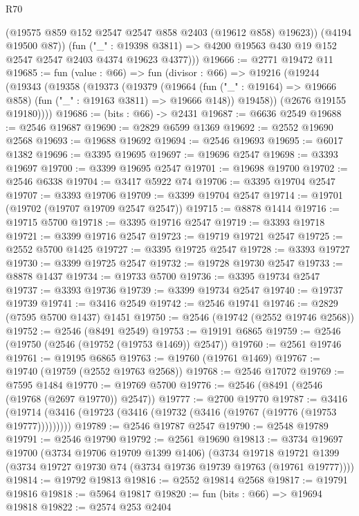 \begin{lexlean}{R70}
\begin{coremodule}
            (@19575 @859 @152 @2547 @2547 @858 @2403 (@19612 @858) @19623))
          (@4194 @19500 @87))
        (fun ("_" : @19398 @3811) =>
        @4200 @19563 @430 @19 @152 @2547 @2547 @2403 @4374 @19623 @4377)))
@19666 := @2771 @19472 @11
@19685 := fun (value : @66) =>
  fun (divisor : @66) =>
  @19216
    (@19244
      (@19343
        (@19358
          (@19373
            (@19379
              (@19664 (fun ("_" : @19164) => @19666 @858) (fun ("_" : @19163 @3811) => @19666 @148))
              @19458))
          (@2676 @19155 @19180))))
@19686 := (bits : @66) -> @2431
@19687 := @6636 @2549
@19688 := @2546 @19687
@19690 := @2829 @6599 @1369
@19692 := @2552 @19690 @2568
@19693 := @19688 @19692
@19694 := @2546 @19693
@19695 := @6017 @1382
@19696 := @3395 @19695
@19697 := @19696 @2547
@19698 := @3393 @19697
@19700 := @3399 @19695 @2547
@19701 := @19698 @19700
@19702 := @2546 @6338
@19704 := @3417 @5922 @74
@19706 := @3395 @19704 @2547
@19707 := @3393 @19706
@19709 := @3399 @19704 @2547
@19714 := @19701 (@19702 (@19707 @19709 @2547 @2547))
@19715 := @8878 @1414
@19716 := @19715 @5700
@19718 := @3395 @19716 @2547
@19719 := @3393 @19718
@19721 := @3399 @19716 @2547
@19723 := @19719 @19721 @2547
@19725 := @2552 @5700 @1425
@19727 := @3395 @19725 @2547
@19728 := @3393 @19727
@19730 := @3399 @19725 @2547
@19732 := @19728 @19730 @2547
@19733 := @8878 @1437
@19734 := @19733 @5700
@19736 := @3395 @19734 @2547
@19737 := @3393 @19736
@19739 := @3399 @19734 @2547
@19740 := @19737 @19739
@19741 := @3416 @2549
@19742 := @2546 @19741
@19746 := @2829 (@7595 @5700 @1437) @1451
@19750 := @2546 (@19742 (@2552 @19746 @2568))
@19752 := @2546 (@8491 @2549)
@19753 := @19191 @6865
@19759 := @2546 (@19750 (@2546 (@19752 (@19753 @1469)) @2547))
@19760 := @2561 @19746
@19761 := @19195 @6865
@19763 := @19760 (@19761 @1469)
@19767 := @19740 (@19759 (@2552 @19763 @2568))
@19768 := @2546 @17072
@19769 := @7595 @1484
@19770 := @19769 @5700
@19776 := @2546 (@8491 (@2546 (@19768 (@2697 @19770)) @2547))
@19777 := @2700 @19770
@19787 := @3416 (@19714 (@3416 (@19723 (@3416 (@19732 (@3416 (@19767 (@19776 (@19753 @19777)))))))))
@19789 := @2546 @19787 @2547
@19790 := @2548 @19789
@19791 := @2546 @19790
@19792 := @2561 @19690
@19813 := @3734
    @19697
    @19700
    (@3734 @19706 @19709 @1399 @1406)
    (@3734
      @19718
      @19721
      @1399
      (@3734 @19727 @19730 @74 (@3734 @19736 @19739 @19763 (@19761 @19777))))
@19814 := @19792 @19813
@19816 := @2552 @19814 @2568
@19817 := @19791 @19816
@19818 := @5964 @19817
@19820 := fun (bits : @66) => @19694 @19818
@19822 := @2574 @253 @2404

\end{coremodule}
\end{lexlean}
